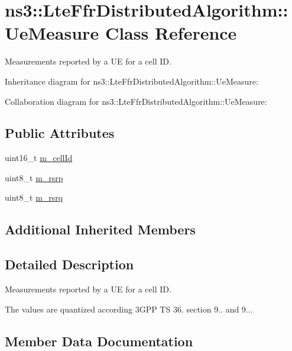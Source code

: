 \hypertarget{classns3_1_1LteFfrDistributedAlgorithm_1_1UeMeasure}{}\section{ns3\+:\+:Lte\+Ffr\+Distributed\+Algorithm\+:\+:Ue\+Measure Class Reference}
\label{classns3_1_1LteFfrDistributedAlgorithm_1_1UeMeasure}


Measurements reported by a UE for a cell ID.  




Inheritance diagram for ns3\+:\+:Lte\+Ffr\+Distributed\+Algorithm\+:\+:Ue\+Measure\+:


Collaboration diagram for ns3\+:\+:Lte\+Ffr\+Distributed\+Algorithm\+:\+:Ue\+Measure\+:
\subsection*{Public Attributes}
\begin{DoxyCompactItemize}
\item 
uint16\+\_\+t \hyperlink{classns3_1_1LteFfrDistributedAlgorithm_1_1UeMeasure_a4b256fc342fce5a9b29b72c573c697d2}{m\+\_\+cell\+Id}
\item 
uint8\+\_\+t \hyperlink{classns3_1_1LteFfrDistributedAlgorithm_1_1UeMeasure_abd43e3ab589c381aa4c87f39d878c471}{m\+\_\+rsrp}
\item 
uint8\+\_\+t \hyperlink{classns3_1_1LteFfrDistributedAlgorithm_1_1UeMeasure_ae3a132fe4e0a1e7ce225d0c7d453c858}{m\+\_\+rsrq}
\end{DoxyCompactItemize}
\subsection*{Additional Inherited Members}


\subsection{Detailed Description}
Measurements reported by a UE for a cell ID. 

The values are quantized according 3\+G\+PP TS 36. section 9.. and 9... 

\subsection{Member Data Documentation}
